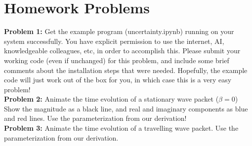 \documentclass[12pt]{article}
\begin{document}
\section{Homework Problems}

\noindent
{\bf Problem 1:} Get the example program (uncertainty.ipynb) running
on your system successfully.  You have explicit permission to use the
internet, AI, knowledgeable colleagues, etc, in order to accomplish
this.  Please submit your working code (even if unchanged) for this
problem, and include some brief comments about the installation steps
that were needed.  Hopefully, the example code will just work out of
the box for you, in which case this is a very easy problem!  \\[5pt]

\noindent
{\bf Problem 2:} Animate the time evolution of a stationary wave
packet ($\beta=0$) Show the magnitude as a black line, and real and imaginary
components as blue and red lines.  Use the parameterization from our derivation!\\[5pt]

\noindent
{\bf Problem 3:} Animate the time evolution of a travelling wave
packet.  Use the parameterization from our derivation.\\[5pt]
\end{document}
